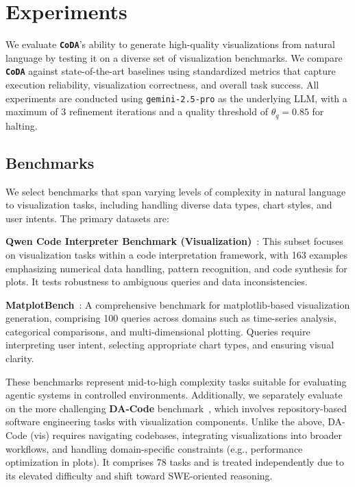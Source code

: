 \documentclass[11pt, a4paper, logo, copyright]{googlecloud}
\newcommand{\methodname}{\textbf{\texttt{\textcolor{StarIndigo}{C}\textcolor{StarIndigo}{o}\textcolor{StarCoral}{D}\textcolor{StarTeal}{A}}}}
\newcommand{\io}[1]{\setlength{\fboxsep}{1pt}\colorbox{gray!10}{\texttt{#1}}}
\begin{document}
\section{Experiments}\label{sec:exp}

We evaluate \methodname{}'s ability to generate high-quality visualizations from natural language by testing it on a diverse set of visualization benchmarks. We compare \methodname{} against state-of-the-art baselines using standardized metrics that capture execution reliability, visualization correctness, and overall task success. All experiments are conducted using \io{gemini-2.5-pro} as the underlying LLM, with a maximum of 3 refinement iterations and a quality threshold of $\theta_q = 0.85$ for halting. 

\subsection{Benchmarks}
We select benchmarks that span varying levels of complexity in natural language to visualization tasks, including handling diverse data types, chart styles, and user intents. The primary datasets are:


\textbf{Qwen Code Interpreter Benchmark (Visualization)}~\citep{Yang2025Qwen3TR}:
This subset focuses on visualization tasks within a code interpretation framework, with 163 examples emphasizing numerical data handling, pattern recognition, and code synthesis for plots. It tests robustness to ambiguous queries and data inconsistencies.

\textbf{MatplotBench}~\citep{yang2024matplotagent}:
A comprehensive benchmark for matplotlib-based visualization generation, comprising 100 queries across domains such as time-series analysis, categorical comparisons, and multi-dimensional plotting. Queries require interpreting user intent, selecting appropriate chart types, and ensuring visual clarity.


These benchmarks represent mid-to-high complexity tasks suitable for evaluating agentic systems in controlled environments.
Additionally, we separately evaluate on the more challenging \textbf{DA-Code} benchmark~\citep{Huang2024DACodeAD}, which involves repository-based software engineering tasks with visualization components. Unlike the above, DA-Code (vis) requires navigating codebases, integrating visualizations into broader workflows, and handling domain-specific constraints (e.g., performance optimization in plots). It comprises 78 tasks and is treated independently due to its elevated difficulty and shift toward SWE-oriented reasoning.
\end{document}

